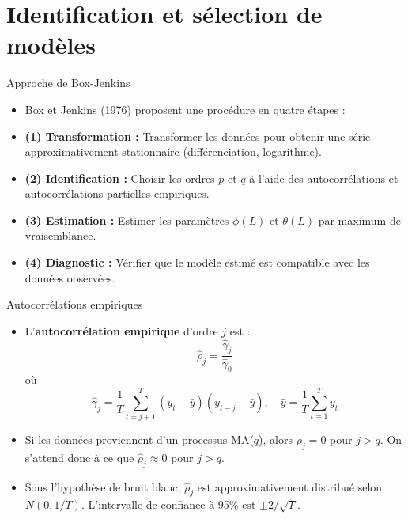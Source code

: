 \documentclass[11pt,aspectratio=169]{beamer}
\begin{document}
\section{Identification et sélection de modèles}

\begin{frame}{Approche de Box-Jenkins}

\begin{itemize}

\item Box et Jenkins (1976) proposent une procédure en quatre étapes :\newline

\item \textbf{(1) Transformation :} Transformer les données pour obtenir une série approximativement stationnaire (différenciation, logarithme).\newline

\item \textbf{(2) Identification :} Choisir les ordres $p$ et $q$ à l'aide des autocorrélations et autocorrélations partielles empiriques.\newline

\item \textbf{(3) Estimation :} Estimer les paramètres $\phi(L)$ et $\theta(L)$ par maximum de vraisemblance.\newline

\item \textbf{(4) Diagnostic :} Vérifier que le modèle estimé est compatible avec les données observées.

\end{itemize}

\end{frame}

\begin{frame}{Autocorrélations empiriques}

\begin{itemize}

\item L'\textbf{autocorrélation empirique} d'ordre $j$ est :
  \[
  \hat{\rho}_j = \frac{\hat{\gamma}_j}{\hat{\gamma}_0}
  \]
  où
  \[
  \hat{\gamma}_j = \frac{1}{T} \sum_{t=j+1}^{T} (y_t - \bar{y})(y_{t-j} - \bar{y}), \quad \bar{y} = \frac{1}{T}\sum_{t=1}^{T} y_t
  \]\newline

\item Si les données proviennent d'un processus MA($q$), alors $\rho_j = 0$ pour $j > q$. On s'attend donc à ce que $\hat{\rho}_j \approx 0$ pour $j > q$.\newline

\item Sous l'hypothèse de bruit blanc, $\hat{\rho}_j$ est approximativement distribué selon $N(0, 1/T)$. L'intervalle de confiance à 95\% est $\pm 2/\sqrt{T}$.

\end{itemize}

\end{frame}
\end{document}
